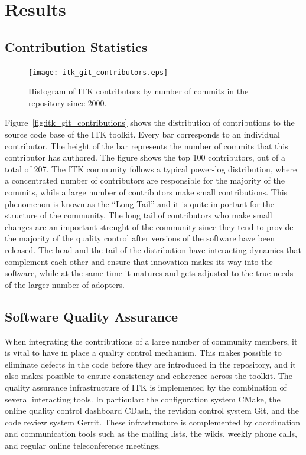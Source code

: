 \documentclass{frontiersENG} %
\begin{document}
\section{Results}

\subsection{Contribution Statistics}

\begin{figure}
  \centering
    \texttt{[image: itk\_git\_contributors.eps]}
    \caption{Histogram of ITK contributors by number of commits in the repository since 2000.}
    \label{fig:itk_git_contributors}
\end{figure}

Figure~\ref{fig:itk_git_contributions} shows the distribution of contributions
to the source code base of the ITK toolkit. Every bar corresponds to an individual
contributor. The height of the bar represents the number of commits that this
contributor has authored. The figure shows the top 100 contributors, out of a
total of 207. The ITK community follows a typical power-log distribution, where
a concentrated number of contributors are responsible for the majority of the
commits, while a large number of contributors make small contributions.  This
phenomenon is known as the ``Long Tail'' and it is quite important for the
structure of the community. The long tail of contributors who make small
changes are an important strenght of the community since they tend to provide
the majority of the quality control after versions of the software have been
released. The head and the tail of the distribution have interacting dynamics
that complement each other and ensure that innovation makes its way into the
software, while at the same time it matures and gets adjusted to the true needs
of the larger number of adopters.

\subsection{Software Quality Assurance}

When integrating the contributions of a large number of community members, it
is vital to have in place a quality control mechanism. This makes possible to
eliminate defects in the code before they are introduced in the repository, and
it also makes possible to ensure consistency and coherence across the toolkit.
The quality assurance infrastructure of ITK is implemented by the combination
of several interacting tools. In particular: the configuration system CMake,
the online quality control dashboard CDash, the revision control system Git,
and the code review system Gerrit. These infrastructure is complemented by
coordination and communication tools such as the mailing lists, the wikis,
weekly phone calls, and regular online teleconference meetings.
\end{document}
